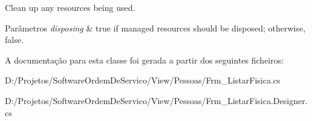 Clean up any resources being used. 


\begin{DoxyParams}{Parâmetros}
{\em disposing} & true if managed resources should be disposed; otherwise, false.\\
\hline
\end{DoxyParams}


A documentação para esta classe foi gerada a partir dos seguintes ficheiros\+:\begin{DoxyCompactItemize}
\item 
D\+:/\+Projetos/\+Software\+Ordem\+De\+Servico/\+View/\+Pessoas/Frm\+\_\+\+Listar\+Fisica.\+cs\item 
D\+:/\+Projetos/\+Software\+Ordem\+De\+Servico/\+View/\+Pessoas/Frm\+\_\+\+Listar\+Fisica.\+Designer.\+cs\end{DoxyCompactItemize}
